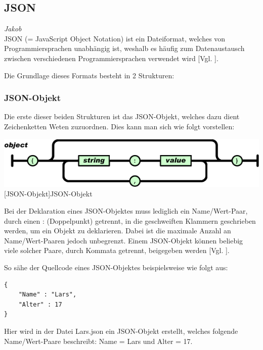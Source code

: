 \documentclass[12pt,a4paper,bibliography=totocnumbered,listof=totocnumbered]{scrartcl}
\begin{document}
\subsection{JSON}
\label{sec:JSON}
\emph{Jakob}\\
JSON (= JavaScript Object Notation) ist ein Dateiformat, welches von Programmiersprachen unabhängig ist, weshalb es häufig zum Datenaustausch zwischen verschiedenen Programmiersprachen verwendet wird [Vgl. \cite{json}].

Die Grundlage dieses Formats besteht in 2 Strukturen:

\subsubsection{JSON-Objekt}
\label{sec:JSON-Objekt}
Die erste dieser beiden Strukturen ist das JSON-Objekt, welches dazu dient Zeichenketten Weten zuzuordnen.
Dies kann man sich wie folgt vorstellen:


\vspace{1em}
\begin{minipage}{\linewidth}
	\centering
	\includegraphics[width=0.9\linewidth]{Bilder/json-object.png}
	[JSON-Objekt]{JSON-Objekt\footnotemark }
	\label{fig:json-objekt}
\end{minipage}

Bei der Deklaration eines JSON-Objektes muss lediglich ein Name/Wert-Paar, durch einen \glqq :\grqq{} (Doppelpunkt) getrennt, in die geschweiften Klammern geschrieben werden, um ein Objekt zu deklarieren.
Dabei ist die maximale Anzahl an Name/Wert-Paaren jedoch unbegrenzt. Einem JSON-Objekt können beliebig viele solcher Paare, durch Kommata getrennt, beigegeben werden [Vgl. \cite{json}].

So sähe der Quellcode eines JSON-Objektes beispielsweise wie folgt aus:
\\
\vspace{1em}
\begin{lstlisting}[caption=Lars.json, label=lst:json-objekt]
{
	"Name" : "Lars",
	"Alter" : 17
}
\end{lstlisting}
Hier wird in der Datei \glqq Lars.json\grqq{} ein JSON-Objekt erstellt, welches folgende Name/Wert-Paare beschreibt:
Name = Lars und Alter = 17.
\end{document}
